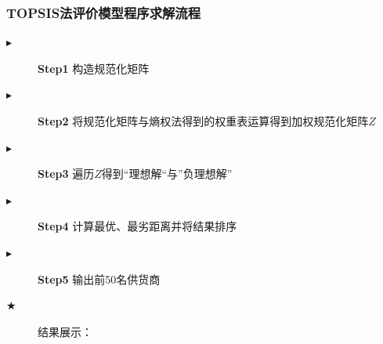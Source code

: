 \documentclass{cumcmthesis}
\begin{document}
\subsubsection*{TOPSIS法评价模型程序求解流程}
\begin{description}
    \item[$\blacktriangleright$] \textbf{Step1} 构造规范化矩阵
    \item[$\blacktriangleright$] \textbf{Step2} 将规范化矩阵与熵权法得到的权重表运算得到加权规范化矩阵$Z$
    \item[$\blacktriangleright$] \textbf{Step3} 遍历$Z$得到“理想解“与”负理想解”
    \item[$\blacktriangleright$] \textbf{Step4} 计算最优、最劣距离并将结果排序
    \item[$\blacktriangleright$] \textbf{Step5} 输出前50名供货商
\end{description}
\newpage
\begin{description}
    \item[$\bigstar$] 结果展示：
\end{description}
\end{document}
